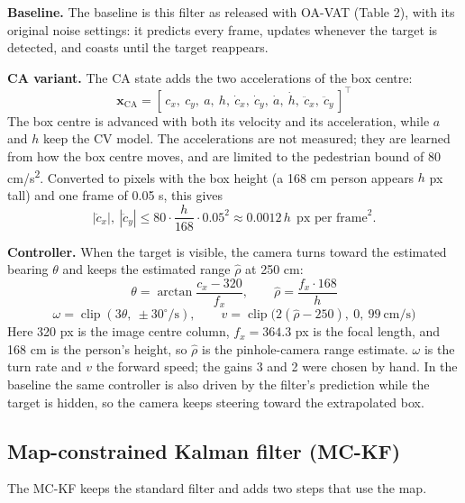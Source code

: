 \documentclass[12pt,a4paper]{article}
\begin{document}
\textbf{Baseline.} The baseline is this filter as released with OA-VAT (Table 2), with its original noise settings: it predicts every frame, updates whenever the target is detected, and coasts until the target reappears.

\textbf{CA variant.} The CA state adds the two accelerations of the box centre:
\begin{equation}
  \mathbf{x}_{\mathrm{CA}} = [\,c_x,\ c_y,\ a,\ h,\ \dot c_x,\ \dot c_y,\ \dot a,\ \dot h,\ \ddot c_x,\ \ddot c_y\,]^{\top}
\end{equation}
The box centre is advanced with both its velocity and its acceleration, while $a$ and $h$ keep the CV model. The accelerations are not measured; they are learned from how the box centre moves, and are limited to the pedestrian bound of 80 cm/s\textsuperscript{2}. Converted to pixels with the box height (a 168 cm person appears $h$ px tall) and one frame of 0.05 s, this gives
\begin{equation}
  |\ddot c_x|,\ |\ddot c_y| \le 80 \cdot \frac{h}{168} \cdot 0.05^2 \approx 0.0012\,h \ \ \text{px per frame}^2.
\end{equation}

\textbf{Controller.} When the target is visible, the camera turns toward the estimated bearing $\theta$ and keeps the estimated range $\hat\rho$ at 250 cm:
\begin{equation}
  \theta = \arctan\frac{c_x-320}{f_x},\qquad \hat{\rho} = \frac{f_x\cdot 168}{h}
\end{equation}
\begin{equation}
  \omega = \operatorname{clip}(3\theta,\ \pm 30^\circ/\mathrm{s}),\qquad v = \operatorname{clip}\big(2(\hat{\rho}-250),\ 0,\ 99\ \mathrm{cm/s}\big)
\end{equation}
Here 320 px is the image centre column, $f_x = 364.3$ px is the focal length, and 168 cm is the person's height, so $\hat\rho$ is the pinhole-camera range estimate. $\omega$ is the turn rate and $v$ the forward speed; the gains 3 and 2 were chosen by hand. In the baseline the same controller is also driven by the filter's prediction while the target is hidden, so the camera keeps steering toward the extrapolated box.

\subsection{Map-constrained Kalman filter (MC-KF)}
The MC-KF keeps the standard filter and adds two steps that use the map.
\end{document}
